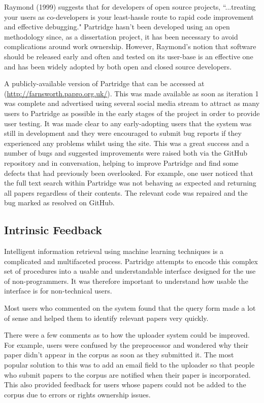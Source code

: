 Raymond (1999) suggests that for developers of open source projects, ``...treating
your users as co-developers is your least-hassle route to rapid code
improvement and effective debugging\cite{raymond1999cathedral}." Partridge
hasn't been developed using an open methodology since, as a dissertation
project, it has been necessary to avoid complications around work ownership.
However, Raymond's notion that software should be released early and often and
tested on its user-base is an effective one and has been widely adopted by both
open and closed source developers\cite{linux2013}\cite{unity2013}.

A publicly-available version of Partridge that can be accessed at
(\url{http://farnsworth.papro.org.uk/}). This was made available as soon as iteration
1 was complete and advertised using several social media stream to attract as many users to Partridge as possible in the early stages of
the project in order to provide user testing. It was made clear to any early-adopting users that the system was still in development and they were
encouraged to submit bug reports if they experienced any problems whilst using
the site. This was a great success and a number of bugs and suggested
improvements were raised both via the GitHub repository and in conversation,
helping to improve Partridge and find some defects that had previously been
overlooked. For example, one user noticed that the full text search within
Partridge was not behaving as expected and returning all papers regardless of
their contents.  The relevant code was repaired and the bug marked as resolved
on GitHub\cite{softlybug2013}.


\subsection{Intrinsic Feedback} 

Intelligent information retrieval using machine learning techniques is a
complicated and multifaceted process. Partridge attempts to encode this complex set of
procedures into a usable and understandable interface designed for the use of
non-programmers. It was therefore important to understand how usable the
interface is for non-technical users.

Most users who commented on the system found that the query form made a lot of
sense and helped them to identify relevant papers very quickly. 

There were a few comments as to how the uploader system could be improved. For example, users
were confused by the preprocessor and wondered why their paper didn't appear in
the corpus as soon as they submitted it. The most popular solution to this was
to add an email field to the uploader so that people who submit papers to the
corpus are notified when their paper is incorporated. This also provided
feedback for users whose papers could not be added to the corpus due to errors
or rights ownership issues.

